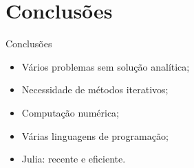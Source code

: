 \documentclass[aspectratio=1610]{beamer}
\begin{document}
\section{Conclusões}

\begin{frame}{Conclusões}

\begin{itemize}
 \item Vários problemas sem solução analítica;
 
 \item Necessidade de métodos iterativos;
 
 \item Computação numérica;
 
 \item Várias linguagens de programação;
 
 \item Julia: recente e eficiente.
\end{itemize}

\end{frame}

\end{document}

